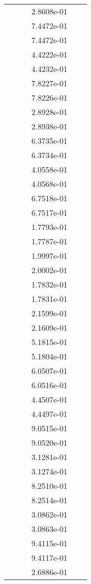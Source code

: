 \begin{xltabular}{\textwidth}{r|rS[table-format=1.3e+2]S[table-format=1.4e+2]S[table-format=1.4e+2]S[table-format=-1.5]}
&  &  & 2.8608e-01 & & \\
&  &  & 7.4472e-01 & & \\
&  &  & 7.4472e-01 & & \\
&  &  & 4.4222e-01 & & \\
&  &  & 4.4232e-01 & & \\
&  &  & 7.8227e-01 & & \\
&  &  & 7.8226e-01 & & \\
&  &  & 2.8928e-01 & & \\
&  &  & 2.8938e-01 & & \\
&  &  & 6.3735e-01 & & \\
&  &  & 6.3734e-01 & & \\
&  &  & 4.0558e-01 & & \\
&  &  & 4.0568e-01 & & \\
&  &  & 6.7518e-01 & & \\
&  &  & 6.7517e-01 & & \\
&  &  & 1.7793e-01 & & \\
&  &  & 1.7787e-01 & & \\
&  &  & 1.9997e-01 & & \\
&  &  & 2.0002e-01 & & \\
&  &  & 1.7832e-01 & & \\
&  &  & 1.7831e-01 & & \\
&  &  & 2.1599e-01 & & \\
&  &  & 2.1609e-01 & & \\
&  &  & 5.1815e-01 & & \\
&  &  & 5.1804e-01 & & \\
&  &  & 6.0507e-01 & & \\
&  &  & 6.0516e-01 & & \\
&  &  & 4.4507e-01 & & \\
&  &  & 4.4497e-01 & & \\
&  &  & 9.0515e-01 & & \\
&  &  & 9.0520e-01 & & \\
&  &  & 3.1281e-01 & & \\
&  &  & 3.1274e-01 & & \\
&  &  & 8.2510e-01 & & \\
&  &  & 8.2514e-01 & & \\
&  &  & 3.0862e-01 & & \\
&  &  & 3.0863e-01 & & \\
&  &  & 9.4115e-01 & & \\
&  &  & 9.4117e-01 & & \\
&  &  & 2.6886e-01 & & \\

\end{xltabular}
